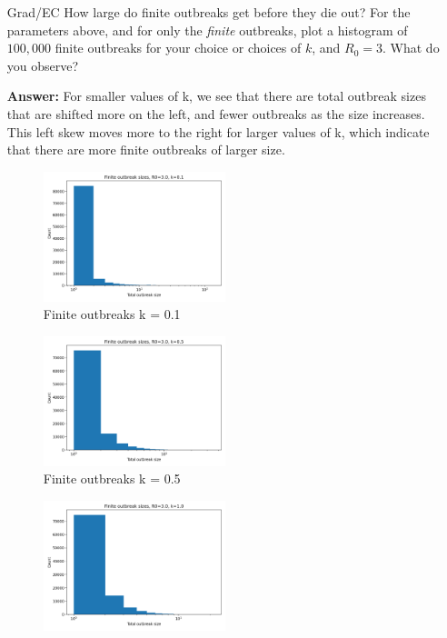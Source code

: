 \documentclass[11pt]{article}
\begin{document}
\begin{enumerate}
\begin{enumerate}[label=\alph*.]
	\item [Grad/EC] How large do finite outbreaks get before they die out? For the parameters above, and for only the {\it finite} outbreaks, plot a histogram of $100,000$ finite outbreaks for your choice or choices of $k$, and $R_0=3$. What do you observe? 
	\par
	\textbf{Answer: } For smaller values of k, we see that there are total outbreak sizes that are shifted more on the left, and fewer outbreaks as the size increases.
	This left skew moves more to the right for larger values of k, which indicate that there are more finite outbreaks of larger size.
	\begin{figure}[H]
		\centering
		\includegraphics[width=0.5\textwidth]{finite_sizes_R03_k0.1.png}
		\caption{Finite outbreaks k = 0.1}
		\label{fig:k_0.1}
	\end{figure}
	\begin{figure}[H]
		\centering
		\includegraphics[width=0.5\textwidth]{finite_sizes_R03_k0.5.png}
		\caption{Finite outbreaks k = 0.5}
		\label{fig:k_0.5}
	\end{figure}
	\begin{figure}[H]
		\centering
		\includegraphics[width=0.5\textwidth]{finite_sizes_R03_k1.0.png}

\end{figure}
\end{enumerate}
\end{enumerate}
\end{document}

